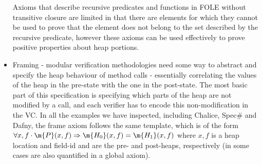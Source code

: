 \begin{itemize}
		Axioms that describe recursive predicates and functions in FOLE without transitive closure are limited in that there are elements for which they cannot be used to prove that the element does not belong to the set described by the recursive predicate, however these axioms can be used effectively to prove positive properties about heap portions.
	\item Framing - modular verification methodologies need some way to abstract and specify the heap behaviour of method calls - essentially correlating the values of the heap in the pre-state with the one in the post-state.
		The most basic part of this specification is specifying which parts of the heap are not modified by a call, and each verifier has to encode this non-modification in the VC.
		In all the examples we have inspected, including Chalice, Spec\# and Dafny, the frame axiom follows the same template, which is of the form $\forall x,f \cdot \m{P}(x,f) \Rightarrow \m{H_0}(x,f)=\m{H_1}(x,f)$ where $x,f$ is a heap location and field-id and  are the pre- and post-heaps, respectively (in some cases  are also quantified in a global axiom).
		\end{itemize}
